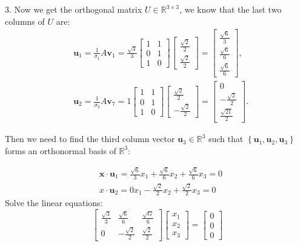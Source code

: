 3. Now we get the orthogonal matrix $U\in\mathbb{R}^{3\times 3}$, we know that the last two columns of $U$ are:
$$
\begin{aligned}
& \boldsymbol{u}_1=\frac{1}{\sigma_1} A \boldsymbol{v}_1=\frac{\sqrt{3}}{3}\left[\begin{array}{ll}
1 & 1 \\
0 & 1 \\
1 & 0
\end{array}\right]\left[\begin{array}{c}
\frac{\sqrt{2}}{2} \\
\frac{\sqrt{2}}{2}
\end{array}\right]=\left[\begin{array}{c}
\frac{\sqrt{6}}{3} \\
\frac{\sqrt{6}}{6} \\
\frac{\sqrt{6}}{6}
\end{array}\right], \\
& \boldsymbol{u}_2=\frac{1}{\sigma_2} A \boldsymbol{v}_7=1\left[\begin{array}{ll}
1 & 1 \\
0 & 1 \\
1 & 0
\end{array}\right]\left[\begin{array}{c}
\frac{\sqrt{2}}{2} \\
-\frac{\sqrt{2}}{2}
\end{array}\right]=\left[\begin{array}{c}
0 \\
-\frac{\sqrt{2}}{2} \\
\frac{\sqrt{21}}{2}
\end{array}\right] .
\end{aligned}
$$

Then we need to find the third column vector $\boldsymbol{u}_3 \in \mathbb{R}^3$ such that $\left\{\boldsymbol{u}_1, \boldsymbol{u}_2, \boldsymbol{u}_3\right\}$ forms an orthonormal basis of $\mathbb{R}^3$:

$$
\begin{aligned}
& \boldsymbol{x} \cdot \boldsymbol{u}_1=\frac{\sqrt{6}}{3} x_1+\frac{\sqrt{6}}{6} x_2+\frac{\sqrt{6}}{6} x_3=0 \\
& x \cdot \boldsymbol{u}_2=0 x_1-\frac{\sqrt{2}}{2} x_2+\frac{\sqrt{2}}{2} x_3=0
\end{aligned}
$$
Solve the linear equations:
$$
\left[\begin{array}{ccc}
\frac{\sqrt{3}}{3} & \frac{\sqrt{6}}{6} & \frac{\sqrt{G}}{6} \\
0 & -\frac{\sqrt{2}}{2} & \frac{\sqrt{2}}{2}
\end{array}\right]\left[\begin{array}{l}
x_1 \\
x_2 \\
x_3
\end{array}\right]=\left[\begin{array}{l}
0 \\
0 \\
0
\end{array}\right]
$$


